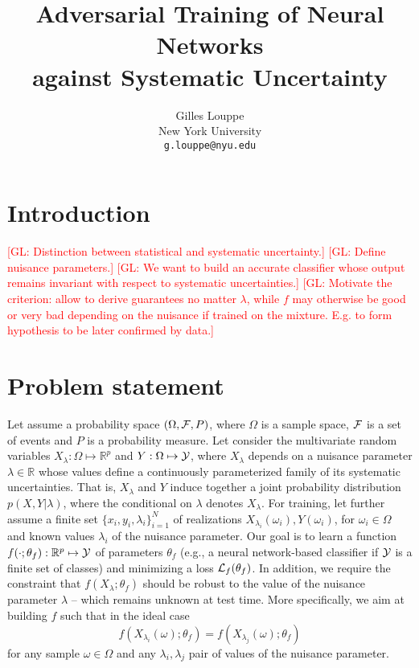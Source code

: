 \documentclass{article}
\title{Adversarial Training of Neural Networks\\
against Systematic Uncertainty}
\author{
  Gilles Louppe \\
  New York University\\
  \texttt{g.louppe@nyu.edu} \\
}
\newcommand{\glnote}[1]{\textcolor{red}{[GL: #1]}}
\theoremstyle{plain}
\begin{document}

\maketitle

\begin{abstract}
\end{abstract}

\section{Introduction}

\glnote{Distinction between statistical and systematic uncertainty.}
\glnote{Define nuisance parameters.}
\glnote{We want to build an accurate classifier whose output remains invariant with
respect to systematic uncertainties.}
\glnote{Motivate the criterion: allow to derive guarantees no matter $\lambda$,
while $f$ may otherwise be good or very bad depending on the nuisance if trained
on the mixture. E.g. to form hypothesis to be later confirmed by data.}



\section{Problem statement}
\label{sec:problem}

Let assume a probability space $(\Omega, {\cal F}, P)$, where $\Omega$ is a
sample space, ${\cal F}$ is a set of events and $P$ is a probability measure.
Let consider the multivariate random variables $X_\lambda: \Omega \mapsto
\mathbb{R}^p$ and $Y: \Omega \mapsto {\cal Y}$, where $X_\lambda$ depends on a
nuisance parameter $\lambda \in \mathbb{R}$ whose values define a continuously
parameterized family of its systematic uncertainties. That is, $X_\lambda$ and
$Y$ induce together a joint probability distribution $p(X,Y|\lambda)$, where the
conditional on $\lambda$ denotes $X_\lambda$. For training, let further assume a
finite set $\{ x_i, y_i, \lambda_i \}_{i=1}^N$ of realizations
$X_{\lambda_i}(\omega_i), Y(\omega_i)$, for $\omega_i \in \Omega$ and known
values $\lambda_i$ of the nuisance parameter. Our goal is to learn a function
$f(\cdot;\theta_f) : \mathbb{R}^p \mapsto {\cal Y}$ of parameters $\theta_f$
(e.g., a neural network-based classifier if ${\cal Y}$ is a finite set of
classes) and minimizing  a loss ${\cal L}_f(\theta_f)$. In addition, we require
the constraint that $f(X_\lambda ;
\theta_f)$ should be robust to the value of the nuisance parameter $\lambda$ --
which remains unknown at test time. More specifically, we aim at building $f$
such that in the ideal case
\begin{equation}\label{eqn:criterion-true}
f(X_{\lambda_i}(\omega) ; \theta_f) = f(X_{\lambda_j}(\omega) ; \theta_f)
\end{equation} for any
sample $\omega \in \Omega$ and any $\lambda_i, \lambda_j$ pair of values of the
nuisance parameter.
\end{document}
